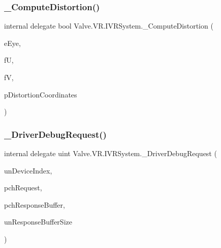 \mbox{\label{struct_valve_1_1_v_r_1_1_i_v_r_system_a88600e2b90cd94cb7fd918636a56cef3}} 
\subsubsection{\texorpdfstring{\_ComputeDistortion()}{\_ComputeDistortion()}}
{\footnotesize\ttfamily internal delegate bool Valve.\+V\+R.\+I\+V\+R\+System.\+\_\+\+Compute\+Distortion (\begin{DoxyParamCaption}\item[{\mbox{\hyperlink{namespace_valve_1_1_v_r_a8153d4a3e627e1cede046327087c1880}{E\+V\+R\+Eye}}}]{e\+Eye,  }\item[{float}]{fU,  }\item[{float}]{fV,  }\item[{ref \mbox{\hyperlink{struct_valve_1_1_v_r_1_1_distortion_coordinates__t}{Distortion\+Coordinates\+\_\+t}}}]{p\+Distortion\+Coordinates }\end{DoxyParamCaption})}

\mbox{\label{struct_valve_1_1_v_r_1_1_i_v_r_system_a818e951800bb68fb2ae856f7f12dd2fe}} 
\subsubsection{\texorpdfstring{\_DriverDebugRequest()}{\_DriverDebugRequest()}}
{\footnotesize\ttfamily internal delegate uint Valve.\+V\+R.\+I\+V\+R\+System.\+\_\+\+Driver\+Debug\+Request (\begin{DoxyParamCaption}\item[{uint}]{un\+Device\+Index,  }\item[{string}]{pch\+Request,  }\item[{System.\+Text.\+String\+Builder}]{pch\+Response\+Buffer,  }\item[{uint}]{un\+Response\+Buffer\+Size }\end{DoxyParamCaption})}

\mbox{\label{struct_valve_1_1_v_r_1_1_i_v_r_system_a664650bb051f15b2aa5974a22fb4f483}} 
